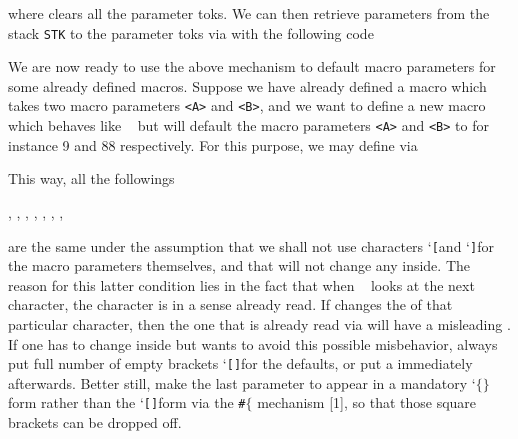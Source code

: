 {where {\tt\string\clrp@r@s} clears all the parameter toks. We can
then retrieve parameters from the stack {\tt STK} to the
parameter toks via {\tt\string \getp@r@s} with the following code


\setraw
  \newcount\temp@count
  \def\getp@r@s{\temp@count=\p@r@count
  {\loop
   \ifnum\temp@count>0
   \expandafter\let\expandafter
   \t@macro\csname STK\the\STKcount
     \string~\endcsname
   \ifcase\temp@count
   \or\global\p@r@one=\expandafter{\t@macro}%
   \or\global\p@r@two=\expandafter{\t@macro}%
   \or\global\p@r@three=\expandafter{\t@macro}%
   \or\global\p@r@four=\expandafter{\t@macro}%
   \or\global\p@r@five=\expandafter{\t@macro}%
   \or\global\p@r@six=\expandafter{\t@macro}%
   \or\global\p@r@seven=\expandafter{\t@macro}%
   \or\global\p@r@eight=\expandafter{\t@macro}%
   \or\global\p@r@nine=\expandafter{\t@macro}%
   \else
    \errmessage
    {Parameter capacity exceeded.}%
   \fi \global\expandafter\let
   \csname STK\the\STKcount
   \string~\endcsname=\undefined@%
   \global\advance\STKcount-1%
   \global\advance\temp@count-1\relax
   \fi
   \ifnum\temp@count>0\repeat}}
\unsetraw



\medskip
We are now ready to use the above mechanism to default
macro parameters for some already defined macros. Suppose we have
already defined a macro {\tt \string\crudemac[<A>][<B>]} which
takes two macro parameters {\tt <A>} and {\tt<B>}, and we want to
define a new macro {\tt \string\smartmac} which behaves like {\tt
\string\crudemac} but will default the macro parameters {\tt <A>}
and {\tt <B>} to for instance 9 and 88 respectively. For this
purpose, we may define {\tt \string\smartmac} via



\setraw
  \def\smartmac{\push{%
   \edef\next@@{\noexpand
   \crudemac[\the\p@r@one][\the\p@r@two]}%
   \popnil\clrp@r@s\next@@}\st@ckparas
   \left@9\right@\left@88\right@\p@r@end}
\unsetraw

This way, all the followings

\setraw
  \crudemac[9][88], \smartmac[9][88],
  \smartmac, \smartmac[], \smartmac[][],
  \smartmac[9], \smartmac[9][], \smartmac[][88]
\unsetraw

are the same under the assumption that we shall not use
characters \lq{\tt[}\rqs and \lq{\tt]}\rqs for the macro
parameters themselves, and that {\tt\string\crudemac} will not
change any {\tt \string\catcode} inside. The reason for this
latter condition lies in the fact that when {\tt\string\smartmac}
looks at the next character, the character is in a sense already
read. If {\tt \string\crudemac} changes the {\tt\string\catcode}
of that particular character, then the one that is already read
via {\tt\string\futurelet} will have a misleading
{\tt\string\catcode}. If one has to change {\tt \string\catcode}
inside but wants to avoid this possible misbehavior, always put
full number of empty brackets \lq{\tt[]}\rqs for the defaults, or
put a {\tt\string\relax} immediately afterwards. Better still,
make the last parameter to appear in a mandatory \lq$\{\}$\rqs form
rather than the \lq{\tt []}\rqs form via the {\tt \#$\{$} mechanism
[1], so that those square brackets can be dropped off.


}
